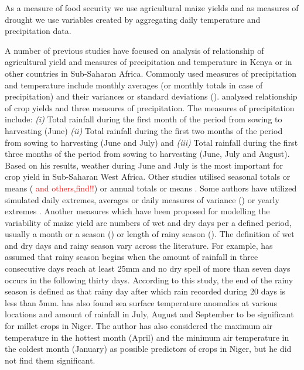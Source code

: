 \documentclass[a4paper,12pt]{article}
\begin{document}
  
As a measure of food security we use agricultural maize yields and as measures of drought we use variables created by aggregating daily temperature and precipitation data.
 
 

 
A number of previous studies have focused on analysis of relationship of agricultural yield and measures of precipitation and temperature in Kenya or in other countries in Sub-Saharan Africa. Commonly used measures of precipitation and temperature include monthly averages (or monthly totals in case of precipitation) and their variances or standard deviations (\citealt{AbrahaSavage2006, LobellEtAl2008, ThorntonEtAl2009}). \cite{Adejuwon2004} analysed relationship of crop yields and three measures of precipitation. The measures of precipitation include: \textit{(i)} Total rainfall during the first month of the period from sowing to harvesting (June) \textit{(ii)} Total rainfall during the first two months of the period from sowing to harvesting (June and July) and \textit{(iii)} Total rainfall during the first three months of the period from sowing to harvesting (June, July and August). Based on his results, weather during June and July is the most important for crop yield in Sub-Saharan West Africa. Other studies utilised seasonal totals or means (\citealt{sagoe2006,LobellBurke2010} \textcolor{red}{and others,find!!}) or annual totals or means \citep{BLIGNAUT2009}.  Some authors have utilized simulated daily extremes, averages or daily measures of variance  (\citealt{SchulzeEtA1993,Chipanshi2003,AbrahaSavage2006}) or yearly extremes \citep{sagoe2006}. Another measures which have been proposed for modelling the variability of maize yield are numbers of wet and dry days per a defined period, usually a month or a season (\citealt{BenMohamed2002,AbrahaSavage2006,sagoe2006,Giannakopoulos2009}) or length of rainy season (\citealt{Leemans1993,BenMohamed2002}). The definition of wet and dry days and rainy season vary across the literature. For example, \cite{BenMohamed2002} has assumed that rainy season begins when the amount of rainfall in three consecutive days reach at least 25mm and no dry spell of more than seven days occurs in the following thirty days. According to this study, the end of the rainy season is defined as that rainy day after which rain recorded during 20 days is less than 5mm. \cite{BenMohamed2002} has also found sea surface temperature anomalies at various locations and amount of rainfall in July, August and September to be significant for millet crops in Niger. The author has also considered the maximum air temperature in the hottest month (April) and the minimum air temperature in the coldest month (January) as possible predictors of crops in Niger, but he did not find them significant.
\end{document}
